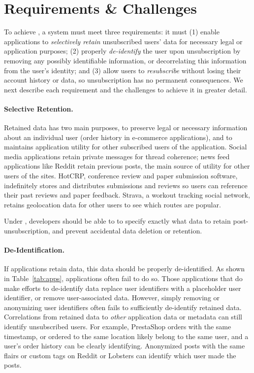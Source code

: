 \section{\sys Requirements \& Challenges}

To achieve \sys, a system must meet three requirements: it must (1) enable applications to
\emph{selectively retain} unsubscribed users' data for necessary legal or application purposes; (2)
properly \emph{de-identify} the user upon unsubscription by removing any possibly identifiable
information, or decorrelating this information from the user's identity; and (3) allow users to
\emph{resubscribe} without losing their account history or data, so unsubscription has no permanent
consequences. We next describe each requirement and the challenges to achieve it in greater detail.

\paragraph{Selective Retention.}
Retained data has two main purposes, to preserve legal or
necessary information about an individual user (\eg order history in e-commerce applications), and
to maintains application utility for other subscribed users of the application.  Social media
applications retain private messages for thread coherence; news feed applications like Reddit retain
previous posts, the main source of utility for other users of the sites.  HotCRP, conference review
and paper submission software, indefinitely stores and distributes submissions and reviews so users
can reference their past reviews and paper feedback. Strava, a workout tracking social network,
retains geolocation data for other users to see which routes are popular.

Under \sys, developers should be able to to specify exactly what data to retain 
post-unsubscription, and prevent accidental data deletion or retention.

\paragraph{De-Identification.}
If applications retain data, this data should be properly de-identified. As shown in
Table~\ref{tab:apps}, applications often fail to do so.
Those applications that do make efforts to de-identify data replace user identifiers with a
placeholder user identifier, or remove user-associated data. However, simply removing or
anonymizing user identifiers often fails to sufficiently de-identify retained data. Correlations
from retained data to \emph{other} application data or metadata can still identify unsubscribed
users. For example, PrestaShop orders with the same timestamp, or ordered to the same location
likely belong to the same user, and a user's order history can be clearly identifying.  Anonymized
posts with the same flairs or custom tags on Reddit or Lobsters can identify which user made the
posts.

